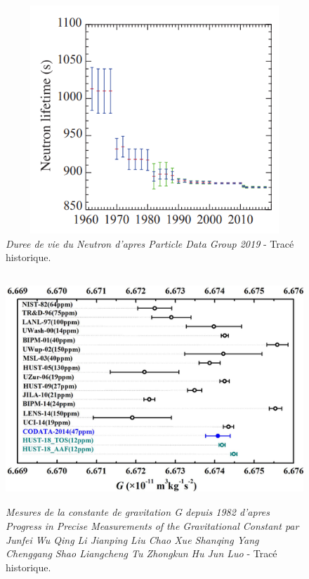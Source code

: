 \documentclass[a4paper,12pt]{article}
\begin{document}
\begin{appendix}
\begin{figure}
\centering
\includegraphics[width=13.5cm,height=8.6cm]{./figures/neutron-lifetime-pdg.png}
\caption [Mesures de la duree de vie du neutron depuis 1962]{\textit{Duree de vie du Neutron d'apres Particle Data Group 2019} - Tracé historique.} 
\label{fig:6:figure6}
\end{figure}


\begin{figure}
\centering
\includegraphics[width=14.5cm,height=8.6cm]{./figures/ProgressinPreciseMeasurementsoftheGravitationalConstant.png}
\caption [Mesures de la constante de gravitation G depuis 1982]{\textit{Mesures de la constante de gravitation G depuis 1982 d'apres Progress in Precise Measurements of the Gravitational Constant par Junfei Wu  Qing Li  Jianping Liu  Chao Xue  Shanqing Yang  Chenggang Shao  Liangcheng Tu  Zhongkun Hu  Jun Luo} - Tracé historique.} 
\label{fig:8:figure8}
\end{figure}


\end{appendix}
\end{document}
